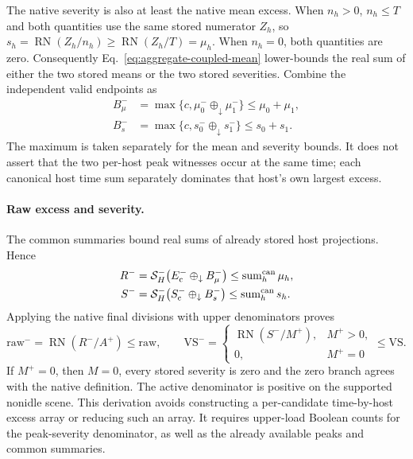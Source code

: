 \documentclass[11pt]{article}
\begin{document}
The native severity is also at least the native mean excess. When $n_h>0$, $n_h\le T$ and both quantities use the same stored numerator $Z_h$, so $s_h=\operatorname{RN}(Z_h/n_h)\ge\operatorname{RN}(Z_h/T)=\mu_h$. When $n_h=0$, both quantities are zero. Consequently Eq.~\eqref{eq:aggregate-coupled-mean} lower-bounds the real sum of either the two stored means or the two stored severities. Combine the independent valid endpoints as
\begin{align}
B_\mu^-&=\max\{c,\mu_0^-\oplus_\downarrow\mu_1^-\}\le\mu_0+\mu_1,\\
B_s^-&=\max\{c,s_0^-\oplus_\downarrow s_1^-\}\le s_0+s_1.
\label{eq:aggregate-pair-projection}
\end{align}
The maximum is taken separately for the mean and severity bounds. It does not assert that the two per-host peak witnesses occur at the same time; each canonical host time sum separately dominates that host's own largest excess.

\paragraph{Raw excess and severity.}
The common summaries bound real sums of already stored host projections. Hence
\begin{align}
R^-&=\mathcal S_H^-\!\left(E_{\rm c}^-\oplus_\downarrow B_\mu^-\right)
 \le\operatorname{sum}^{\rm can}_h\mu_h,\\
S^-&=\mathcal S_H^-\!\left(S_{\rm c}^-\oplus_\downarrow B_s^-\right)
 \le\operatorname{sum}^{\rm can}_hs_h.
\label{eq:aggregate-profile-numerators}
\end{align}
Applying the native final divisions with upper denominators proves
\begin{equation}
\mathrm{raw}^-=\operatorname{RN}(R^-/A^+)\le\mathrm{raw},
\qquad
\mathrm{VS}^-=\begin{cases}\operatorname{RN}(S^-/M^+),&M^+>0,\\0,&M^+=0\end{cases}\le\mathrm{VS}.
\label{eq:aggregate-raw-severity}
\end{equation}
If $M^+=0$, then $M=0$, every stored severity is zero and the zero branch agrees with the native definition. The active denominator is positive on the supported nonidle scene. This derivation avoids constructing a per-candidate time-by-host excess array or reducing such an array. It requires upper-load Boolean counts for the peak-severity denominator, as well as the already available peaks and common summaries.
\end{document}
